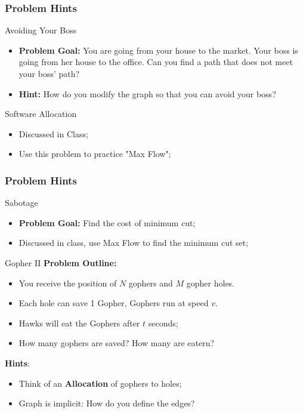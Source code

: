 \begin{frame}
  \frametitle{Problem Hints}
  \begin{block}{Avoiding Your Boss}
    \begin{itemize}
    \item {\bf Problem Goal:} You are going from your house to the market. Your boss is going from her house to the office. Can you find a path that does not meet your boss' path?\bigskip

    \item {\bf Hint:} How do you modify the graph so that you can avoid your boss?
    \end{itemize}
  \end{block}

  \begin{exampleblock}{Software Allocation}
    \begin{itemize}
    \item Discussed in Class;
    \item Use this problem to practice "Max Flow";
    \end{itemize}
  \end{exampleblock}
\end{frame}

\begin{frame}
  \frametitle{Problem Hints}
  \begin{block}{Sabotage}
    \begin{itemize}
    \item {\bf Problem Goal:} Find the cost of minimum cut;
    \item Discussed in class, use Max Flow to find the minimum cut set;
    \end{itemize}
  \end{block}

  \begin{exampleblock}{Gopher II}
    {\bf Problem Outline:}
    \begin{itemize}
    \item You receive the position of $N$ gophers and $M$ gopher holes.
    \item Each hole can save 1 Gopher, Gophers run at speed $v$.
    \item Hawks will eat the Gophers after $t$ seconds;
    \item How many gophers are saved? How many are eatern?
    \end{itemize}
    {\bf Hints}:
    \begin{itemize}
      \item Think of an {\bf Allocation} of gophers to holes;
      \item Graph is implicit: How do you define the edges?
    \end{itemize}
  \end{exampleblock}
\end{frame}
